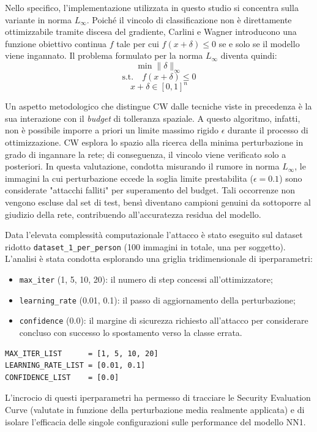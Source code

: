 \documentclass[a4paper, 12pt]{article}
\begin{document}
Nello specifico, l'implementazione utilizzata in questo studio si concentra sulla variante in norma $L_\infty$. Poiché il vincolo di classificazione non è direttamente ottimizzabile tramite discesa del gradiente, Carlini e Wagner introducono una funzione obiettivo continua $f$ tale per cui $f(x+\delta) \le 0$ se e solo se il modello viene ingannato. Il problema formulato per la norma $L_\infty$ diventa quindi:
$$ \min \|\delta\|_\infty $$
$$ \text{s.t.} \quad f(x + \delta) \le 0 $$
$$ x + \delta \in [0, 1]^n $$

Un aspetto metodologico che distingue CW dalle tecniche viste in precedenza è la sua interazione con 
il \textit{budget} di tolleranza spaziale. A questo algoritmo, infatti, non è possibile imporre a 
priori un limite massimo rigido $\epsilon$ durante il processo di ottimizzazione. CW esplora lo
spazio alla ricerca della minima perturbazione in grado di ingannare la rete; di conseguenza, il 
vincolo viene verificato solo a posteriori. In questa valutazione, condotta misurando il rumore in 
norma $L_\infty$, le immagini la cui perturbazione eccede la soglia limite prestabilita ($\epsilon = 0.1$) 
sono considerate "attacchi falliti" per superamento del budget. Tali occorrenze non vengono escluse 
dal set di test, bensì diventano campioni genuini da sottoporre al giudizio della rete, contribuendo 
all'accuratezza residua del modello.

Data l'elevata complessità computazionale l'attacco è stato eseguito sul dataset ridotto \texttt{dataset\_1\_per\_person} (100 immagini in totale, una per soggetto). L'analisi è stata condotta esplorando una griglia tridimensionale di iperparametri:
\begin{itemize}
    \item \texttt{max\_iter} (1, 5, 10, 20): il numero di step concessi all'ottimizzatore;
    \item \texttt{learning\_rate} (0.01, 0.1): il passo di aggiornamento della perturbazione;
    \item \texttt{confidence} (0.0): il margine di sicurezza richiesto all'attacco per considerare concluso con successo lo spostamento verso la classe errata.
\end{itemize}

\begin{verbatim}
MAX_ITER_LIST      = [1, 5, 10, 20]
LEARNING_RATE_LIST = [0.01, 0.1]
CONFIDENCE_LIST    = [0.0]

\end{verbatim}


L'incrocio di questi iperparametri ha permesso di tracciare le Security Evaluation Curve 
(valutate in funzione della perturbazione media realmente applicata) e di isolare l'efficacia 
delle singole configurazioni sulle performance del modello NN1.
\end{document}
